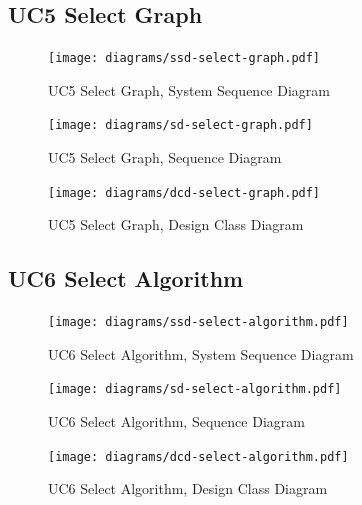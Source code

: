 \subsection{UC5 Select Graph}
\begin{figure}[H]
    \centering
    \texttt{[image: diagrams/ssd-select-graph.pdf]}
    \caption{UC5 Select Graph, System Sequence Diagram}
    \label{fig:select-graph-ssd}
\end{figure}
\begin{figure}[H]
    \centering
    \texttt{[image: diagrams/sd-select-graph.pdf]}
    \caption{UC5 Select Graph, Sequence Diagram}
    \label{fig:select-graph-sd}
\end{figure}
\begin{figure}[H]
    \centering
    \texttt{[image: diagrams/dcd-select-graph.pdf]}
    \caption{UC5 Select Graph, Design Class Diagram}
    \label{fig:select-graph-dcd}
\end{figure}
% 
\subsection{UC6 Select Algorithm}
\begin{figure}[H]
    \centering
    \texttt{[image: diagrams/ssd-select-algorithm.pdf]}
    \caption{UC6 Select Algorithm, System Sequence Diagram}
    \label{fig:select-algorithm-ssd}
\end{figure}
\begin{figure}[H]
    \centering
    \texttt{[image: diagrams/sd-select-algorithm.pdf]}
    \caption{UC6 Select Algorithm, Sequence Diagram}
    \label{fig:select-algorithm-sd}
\end{figure}
\begin{figure}[H]
    \centering
    \texttt{[image: diagrams/dcd-select-algorithm.pdf]}
    \caption{UC6 Select Algorithm, Design Class Diagram}
    \label{fig:select-algorithm-dcd}
\end{figure}
% 
